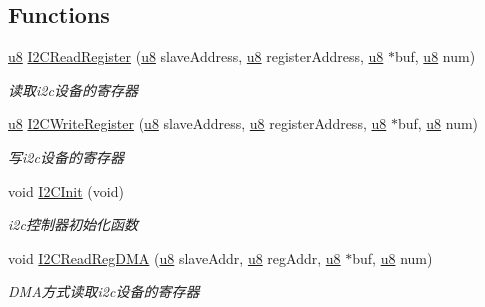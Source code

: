 \subsection*{\-Functions}
\begin{DoxyCompactItemize}
\item 
\hyperlink{group___b_s_p_gaed742c436da53c1080638ce6ef7d13de}{u8} \hyperlink{group___i2_c_ga03d622963958101e7a276a3188365c21}{\-I2\-C\-Read\-Register} (\hyperlink{group___b_s_p_gaed742c436da53c1080638ce6ef7d13de}{u8} slave\-Address, \hyperlink{group___b_s_p_gaed742c436da53c1080638ce6ef7d13de}{u8} register\-Address, \hyperlink{group___b_s_p_gaed742c436da53c1080638ce6ef7d13de}{u8} $\ast$buf, \hyperlink{group___b_s_p_gaed742c436da53c1080638ce6ef7d13de}{u8} num)
\begin{DoxyCompactList}\small\item\em 读取i2c设备的寄存器 \end{DoxyCompactList}\item 
\hyperlink{group___b_s_p_gaed742c436da53c1080638ce6ef7d13de}{u8} \hyperlink{group___i2_c_gae595c5041521bcb3d1d19a2d97bdf365}{\-I2\-C\-Write\-Register} (\hyperlink{group___b_s_p_gaed742c436da53c1080638ce6ef7d13de}{u8} slave\-Address, \hyperlink{group___b_s_p_gaed742c436da53c1080638ce6ef7d13de}{u8} register\-Address, \hyperlink{group___b_s_p_gaed742c436da53c1080638ce6ef7d13de}{u8} $\ast$buf, \hyperlink{group___b_s_p_gaed742c436da53c1080638ce6ef7d13de}{u8} num)
\begin{DoxyCompactList}\small\item\em 写i2c设备的寄存器 \end{DoxyCompactList}\item 
void \hyperlink{group___i2_c_ga7d23473bd5eb72909c1a3588a70bb237}{\-I2\-C\-Init} (void)
\begin{DoxyCompactList}\small\item\em i2c控制器初始化函数 \end{DoxyCompactList}\item 
void \hyperlink{group___i2_c_ga8d90041eb72157c18ceaf840e22945a3}{\-I2\-C\-Read\-Reg\-D\-M\-A} (\hyperlink{group___b_s_p_gaed742c436da53c1080638ce6ef7d13de}{u8} slave\-Addr, \hyperlink{group___b_s_p_gaed742c436da53c1080638ce6ef7d13de}{u8} reg\-Addr, \hyperlink{group___b_s_p_gaed742c436da53c1080638ce6ef7d13de}{u8} $\ast$buf, \hyperlink{group___b_s_p_gaed742c436da53c1080638ce6ef7d13de}{u8} num)
\begin{DoxyCompactList}\small\item\em \-D\-M\-A方式读取i2c设备的寄存器 \end{DoxyCompactList}\item 

\end{DoxyCompactItemize}
